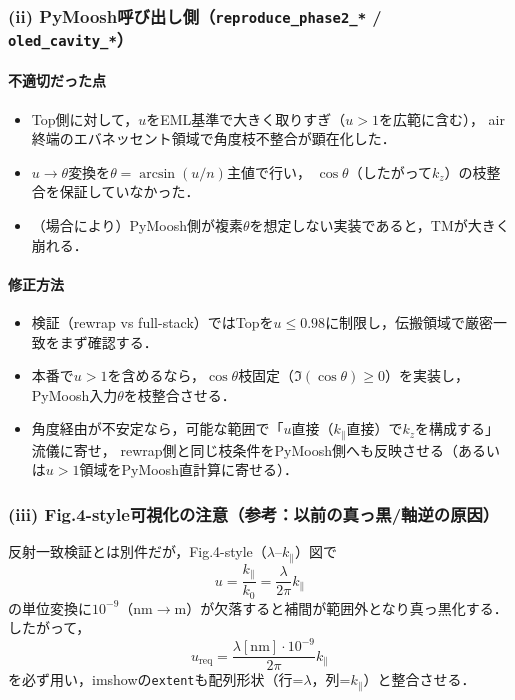 \subsubsection{(ii) PyMoosh呼び出し側（\texttt{reproduce\_phase2\_*} / \texttt{oled\_cavity\_*}）}
\paragraph{不適切だった点}
\begin{itemize}
\item Top側に対して，$u$をEML基準で大きく取りすぎ（$u>1$を広範に含む），
      air終端のエバネッセント領域で角度枝不整合が顕在化した．
\item $u\to\theta$変換を$\theta=\arcsin(u/n)$主値で行い，
      $\cos\theta$（したがって$k_z$）の枝整合を保証していなかった．
\item （場合により）PyMoosh側が複素$\theta$を想定しない実装であると，TMが大きく崩れる．
\end{itemize}

\paragraph{修正方法}
\begin{itemize}
\item 検証（rewrap vs full-stack）ではTopを$u\le 0.98$に制限し，伝搬領域で厳密一致をまず確認する．
\item 本番で$u>1$を含めるなら，$\cos\theta$枝固定（$\Im(\cos\theta)\ge 0$）を実装し，
      PyMoosh入力$\theta$を枝整合させる．
\item 角度経由が不安定なら，可能な範囲で「$u$直接（$k_\parallel$直接）で$k_z$を構成する」流儀に寄せ，
      rewrap側と同じ枝条件をPyMoosh側へも反映させる（あるいは$u>1$領域をPyMoosh直計算に寄せる）．
\end{itemize}

\subsubsection{(iii) Fig.4-style可視化の注意（参考：以前の真っ黒/軸逆の原因）}
反射一致検証とは別件だが，Fig.4-style（$\lambda$--$k_\parallel$）図で
\[
u=\frac{k_\parallel}{k_0}=\frac{\lambda}{2\pi}k_\parallel
\]
の単位変換に$10^{-9}$（nm$\to$m）が欠落すると補間が範囲外となり真っ黒化する．
したがって，
\[
u_{\mathrm{req}}=\frac{\lambda[\mathrm{nm}]\cdot 10^{-9}}{2\pi}k_\parallel
\]
を必ず用い，imshowの\texttt{extent}も配列形状（行=$\lambda$，列=$k_\parallel$）と整合させる．

